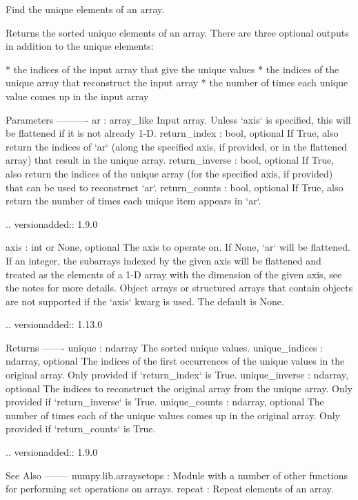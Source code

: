 \begin{DoxyVerb}Find the unique elements of an array.

Returns the sorted unique elements of an array. There are three optional
outputs in addition to the unique elements:

* the indices of the input array that give the unique values
* the indices of the unique array that reconstruct the input array
* the number of times each unique value comes up in the input array

Parameters
----------
ar : array_like
    Input array. Unless `axis` is specified, this will be flattened if it
    is not already 1-D.
return_index : bool, optional
    If True, also return the indices of `ar` (along the specified axis,
    if provided, or in the flattened array) that result in the unique array.
return_inverse : bool, optional
    If True, also return the indices of the unique array (for the specified
    axis, if provided) that can be used to reconstruct `ar`.
return_counts : bool, optional
    If True, also return the number of times each unique item appears
    in `ar`.

    .. versionadded:: 1.9.0

axis : int or None, optional
    The axis to operate on. If None, `ar` will be flattened. If an integer,
    the subarrays indexed by the given axis will be flattened and treated
    as the elements of a 1-D array with the dimension of the given axis,
    see the notes for more details.  Object arrays or structured arrays
    that contain objects are not supported if the `axis` kwarg is used. The
    default is None.

    .. versionadded:: 1.13.0

Returns
-------
unique : ndarray
    The sorted unique values.
unique_indices : ndarray, optional
    The indices of the first occurrences of the unique values in the
    original array. Only provided if `return_index` is True.
unique_inverse : ndarray, optional
    The indices to reconstruct the original array from the
    unique array. Only provided if `return_inverse` is True.
unique_counts : ndarray, optional
    The number of times each of the unique values comes up in the
    original array. Only provided if `return_counts` is True.

    .. versionadded:: 1.9.0

See Also
--------
numpy.lib.arraysetops : Module with a number of other functions for
                        performing set operations on arrays.
repeat : Repeat elements of an array.


\end{DoxyVerb}
